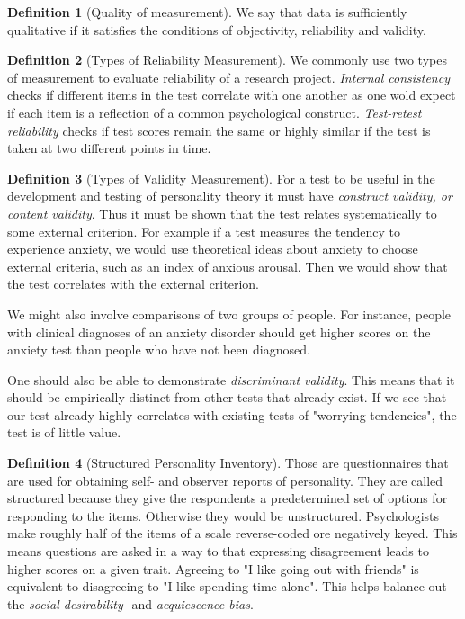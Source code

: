 \documentclass{article}
\theoremstyle{definition}
\newtheorem{definition}{Definition}
\theoremstyle{Solution}
\begin{document}
\begin{definition}[Quality of measurement]
We say that data is sufficiently qualitative if it satisfies the conditions of objectivity, reliability and validity.
\end{definition}

\begin{definition}[Types of Reliability Measurement]
We commonly use two types of measurement to evaluate reliability of a research project. \textit{Internal consistency} checks if different items in the test correlate with one another as one wold expect if each item is a reflection of a common psychological construct. \textit{Test-retest reliability} checks if test scores remain the same or highly similar if the test is taken at two different points in time.
\end{definition}

\begin{definition}[Types of Validity Measurement]
For a test to be useful in the development and testing of personality theory it must have \textit{construct validity, or content validity}. Thus it must be shown that the test relates systematically to some external criterion. For example if a test measures the tendency to experience anxiety, we would use theoretical ideas about anxiety to choose external criteria, such as an index of anxious arousal. Then we would show that the test correlates with the external criterion.

We might also involve comparisons of two groups of people. For instance, people with clinical diagnoses of an anxiety disorder should get higher scores on the anxiety test than people who have not been diagnosed.

One should also be able to demonstrate \textit{discriminant validity}. This means that it should be empirically distinct from other tests that already exist. If we see that our test already highly correlates with existing tests of "worrying tendencies", the test is of little value.
\end{definition}

\begin{definition}[Structured Personality Inventory]
Those are questionnaires that are used for obtaining self- and observer reports of personality. They are called structured because they give the respondents a predetermined set of options for responding to the items. Otherwise they would be unstructured. Psychologists make roughly half of the items of a scale reverse-coded ore negatively keyed. This means questions are asked in a way to that expressing disagreement leads to higher scores on a given trait. Agreeing to "I like going out with friends" is equivalent to disagreeing to "I like spending time alone". This helps balance out the \textit{social desirability-} and \textit{acquiescence bias}.
\end{definition}
\end{document}
